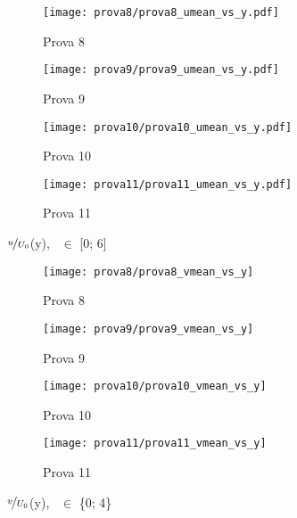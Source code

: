 \documentclass{article} %
\newcommand{\xd}{\nicefrac{\textrm{x}}{\textrm{D}}\ }
\begin{document}
\begin{figure}[h!]
	\centering
	\begin{subfigure}[b]{0.24\textwidth}
		\texttt{[image: prova8/prova8\_umean\_vs\_y.pdf]}
		\caption{Prova 8}
	\end{subfigure}
	\begin{subfigure}[b]{0.24\textwidth}
		\texttt{[image: prova9/prova9\_umean\_vs\_y.pdf]}
		\caption{Prova 9}
	\end{subfigure}
	\begin{subfigure}[b]{0.24\textwidth}
		\texttt{[image: prova10/prova10\_umean\_vs\_y.pdf]}
		\caption{Prova 10}
	\end{subfigure}
	\begin{subfigure}[b]{0.24\textwidth}
		\texttt{[image: prova11/prova11\_umean\_vs\_y.pdf]}
		\caption{Prova 11}
	\end{subfigure}
	\caption{$\nicefrac{u}{U_0}$(y), \xd $\in$ [0; 6]}
	\label{fig:umean_vs_y_8901}
\end{figure}
\begin{figure}[h!]
	\centering
	\begin{subfigure}[b]{0.24\textwidth}
		\texttt{[image: prova8/prova8\_vmean\_vs\_y]}
		\caption{Prova 8}
	\end{subfigure}
	\begin{subfigure}[b]{0.24\textwidth}
		\texttt{[image: prova9/prova9\_vmean\_vs\_y]}
		\caption{Prova 9}
	\end{subfigure}
	\begin{subfigure}[b]{0.24\textwidth}
		\texttt{[image: prova10/prova10\_vmean\_vs\_y]}
		\caption{Prova 10}
	\end{subfigure}
	\begin{subfigure}[b]{0.24\textwidth}
		\texttt{[image: prova11/prova11\_vmean\_vs\_y]}
		\caption{Prova 11}
	\end{subfigure}
	\caption{$\nicefrac{v}{U_0}$(y), \xd $\in$ \{0; 4\}}
	\label{fig:vmean_vs_y_8901}
\end{figure}
\clearpage
\end{document}
